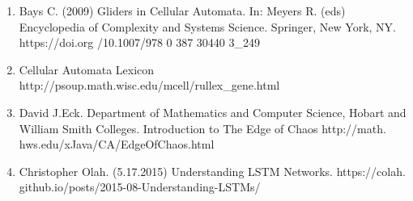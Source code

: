 \documentclass[12pt]{article}
\numberwithin{figure}{section} %
\begin{document}
\begin{enumerate}[topsep=0pt,itemsep=-1ex,partopsep=1ex,parsep=1ex]
\item Bays C. (2009) Gliders in Cellular Automata. In: Meyers R. (eds) Encyclopedia of Complexity and Systems Science. Springer, New York, NY. https://doi.org
\linebreak/10.1007/978 0 387 30440 3\_249
\item Cellular Automata Lexicon http://psoup.math.wisc.edu/mcell/rullex\_gene.html
\item David J.Eck. Department of Mathematics and Computer Science, Hobart and William Smith Colleges. Introduction to The Edge of Chaos http://math.\linebreak
hws.edu/xJava/CA/EdgeOfChaos.html
\item Christopher Olah. (5.17.2015) Understanding LSTM Networks. https://colah.\linebreak
github.io/posts/2015-08-Understanding-LSTMs/

\end{enumerate}
\end{document}

